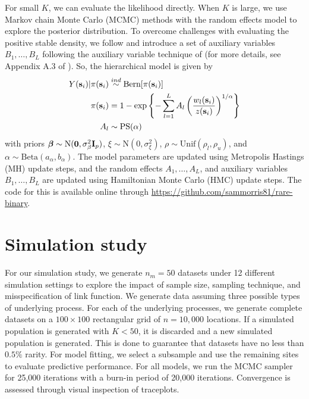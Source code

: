 \documentclass[11pt]{article}
\begin{document}
For small $K$, we can evaluate the likelihood directly.
When $K$ is large, we use Markov chain Monte Carlo (MCMC) methods with the random effects model to explore the posterior distribution.
To overcome challenges with evaluating the positive stable density, we follow \citet{Reich2012} and introduce a set of auxiliary variables $B_1, \ldots, B_L$ following the auxiliary variable technique of \citet{Stephenson2009} (for more details, see Appendix A.3 of \citet{Reich2012}).
So, the hierarchical model is given by
\begin{align}
  Y(\mbox{\bf s}_i) | \pi(\mbox{\bf s}_i) &\stackrel{ind}{\sim} \text{Bern}[\pi(\mbox{\bf s}_i)] \\
    \pi(\mbox{\bf s}_i) &= 1 - \exp \left\{ -\displaystyle \sum_{ l = 1 }^{L} A_l \left( \frac{ w_{l}(\mbox{\bf s}_i) }{ z(\mbox{\bf s}_i) } \right)^{ 1/\alpha} \right\} \nonumber\\
    A_l &\sim \text{PS}(\alpha) \nonumber
\end{align}
with priors $\mbox{\boldmath $\beta$} \sim \text{N}(\mbox{\boldmath $0$}, \sigma^2_\beta \mbox{\bf I}_p )$, $\xi \sim \text{N}(0, \sigma^2_\xi)$, $\rho \sim \text{Unif}(\rho_l, \rho_u)$, and $\alpha \sim \text{Beta}(a_\alpha, b_\alpha)$.
The model parameters are updated using Metropolis Hastings (MH) update steps, and the random effects $A_1, \ldots, A_L$, and auxiliary variables $B_1, \ldots, B_L$ are updated using Hamiltonian Monte Carlo (HMC) update steps.
The code for this is available online through \url{https://github.com/sammorris81/rare-binary}.

\section{Simulation study}\label{rbs:sim}

For our simulation study, we generate $n_m = 50$ datasets under 12 different simulation settings to explore the impact of sample size, sampling technique, and misspecification of link function.
We generate data assuming three possible types of underlying process.
For each of the underlying processes, we generate complete datasets on a $100 \times 100$ rectangular grid of $n = 10,000$ locations.
If a simulated population is generated with $K < 50$, it is discarded and a new simulated population is generated.
This is done to guarantee that datasets have no less than $0.5\%$ rarity.
For model fitting, we select a subsample and use the remaining sites to evaluate predictive performance.
For all models, we run the MCMC sampler for 25,000 iterations with a burn-in period of 20,000 iterations.
Convergence is assessed through visual inspection of traceplots.
\end{document}
